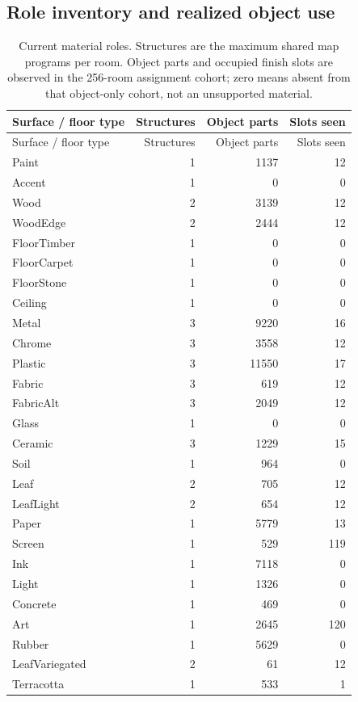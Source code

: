 \subsection{Role inventory and realized object use}
\small
\begin{longtable}{lrrr}
\caption{Current material roles. Structures are the maximum shared map programs per room. Object parts and occupied finish slots are observed in the 256-room assignment cohort; zero means absent from that object-only cohort, not an unsupported material.}\\
\toprule Surface / floor type & Structures & Object parts & Slots seen \\\midrule
\endfirsthead
\toprule Surface / floor type & Structures & Object parts & Slots seen \\\midrule
\endhead
Paint & 1 & 1137 & 12 \\
Accent & 1 & 0 & 0 \\
Wood & 2 & 3139 & 12 \\
WoodEdge & 2 & 2444 & 12 \\
FloorTimber & 1 & 0 & 0 \\
FloorCarpet & 1 & 0 & 0 \\
FloorStone & 1 & 0 & 0 \\
Ceiling & 1 & 0 & 0 \\
Metal & 3 & 9220 & 16 \\
Chrome & 3 & 3558 & 12 \\
Plastic & 3 & 11550 & 17 \\
Fabric & 3 & 619 & 12 \\
FabricAlt & 3 & 2049 & 12 \\
Glass & 1 & 0 & 0 \\
Ceramic & 3 & 1229 & 15 \\
Soil & 1 & 964 & 0 \\
Leaf & 2 & 705 & 12 \\
LeafLight & 2 & 654 & 12 \\
Paper & 1 & 5779 & 13 \\
Screen & 1 & 529 & 119 \\
Ink & 1 & 7118 & 0 \\
Light & 1 & 1326 & 0 \\
Concrete & 1 & 469 & 0 \\
Art & 1 & 2645 & 120 \\
Rubber & 1 & 5629 & 0 \\
LeafVariegated & 2 & 61 & 12 \\
Terracotta & 1 & 533 & 1 \\

\end{longtable}
